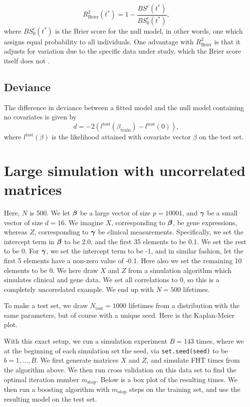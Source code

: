 \begin{equation*}
    R^2_{\text{Brier}}(t^*)=1-\frac{BS^c(t^*)}{BS^c_0(t^*)},
\end{equation*}
where $BS^c_0(t^*)$ is the Brier score for the null model, in other words, one which assigns equal probability to all individuals. One advantage with $R^2_{\text{Brier}}$ is that it adjusts for variation due to the specific data under study, which the Brier score itself does not \citep{bovelstadborgan}.

\subsection{Deviance}
The difference in deviance between a fitted model and the null model containing no covariates is given by
\begin{equation*}
    d=-2\left(l^{\text{test}}(\beta_{\text{train}})-l^{\text{test}}(0)\right),
\end{equation*}
where $l^{\text{test}}(\beta)$ is the likelihood attained with covariate vector $\beta$ on the test set.

\section{Large simulation with uncorrelated matrices}
Here, $N$ is 500. We let $\boldsymbol{\beta}$ be a large vector of size $p=10001$, and $\boldsymbol{\gamma}$ be a small vector of size $d=16$. We imagine $X$, corresponding to $\boldsymbol{\beta}$, be gene expressions, whereas $Z$, corresponding to $\boldsymbol{\gamma}$ be clinical measurements. Specifically, we set the intercept term in $\boldsymbol{\beta}$ to be 2.0, and the first 35 elements to be 0.1. We set the rest to be 0. For $\boldsymbol{\gamma}$, we set the intercept term to be -1, and in similar fashion, let the first 5 elements have a non-zero value of -0.1. Here also we set the remaining 10 elements to be 0.
We here draw $X$ and $Z$ from a simulation algorithm which simulates clinical and gene data. We set all correlations to 0, so this is a completely uncorrelated example. We end up with $N=500$ lifetimes.

To make a test set, we draw $N_{\text{test}}=1000$ lifetimes from a distribution with the same parameters, but of course with a unique seed.
Here is the Kaplan-Meier plot.

With this exact setup, we run a simulation experiment $B=143$ times, where we at the beginning of each simulation set the seed, via \verb|set.seed(seed)| to be $b=1,\ldots,B$. We first generate matrices $X$ and $Z$, and simulate FHT times from the algorithm above. We then run cross validation on this data set to find the optimal iteration number $m_{\text{stop}}$. Below is a box plot of the resulting times. We then run a boosting algorithm with $m_{\text{stop}}$ steps on the training set, and use the resulting model on the test set.

